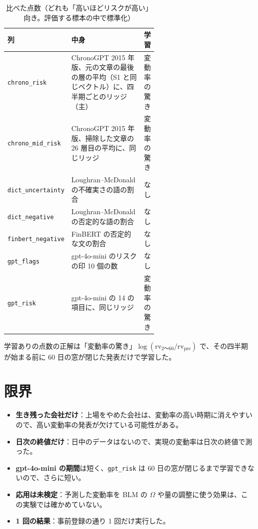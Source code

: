 \documentclass[xelatex,ja=standard,jafont=haranoaji,a4paper,10pt,openany]{bxjsreport}
\newcommand{\code}[1]{\texttt{#1}}
\begin{document}
\begin{table}[H]
\centering\small
\caption{比べた点数（どれも「高いほどリスクが高い」向き。評価する標本の中で標準化）}
\label{tab:scores}
\begin{tabular}{@{}lp{0.6\linewidth}l@{}}
\toprule
列 & 中身 & 学習 \\
\midrule
\code{chrono\_risk} & ChronoGPT 2015 年版、元の文章の最後の層の平均（S1 と同じベクトル）に、四半期ごとのリッジ（主） & 変動率の驚き \\
\code{chrono\_mid\_risk} & ChronoGPT 2015 年版、掃除した文章の 26 層目の平均に、同じリッジ & 変動率の驚き \\
\code{dict\_uncertainty} & Loughran--McDonald の不確実さの語の割合 & なし \\
\code{dict\_negative} & Loughran--McDonald の否定的な語の割合 & なし \\
\code{finbert\_negative} & FinBERT の否定的な文の割合 & なし \\
\code{gpt\_flags} & gpt-4o-mini のリスクの印 10 個の数 & なし \\
\code{gpt\_risk} & gpt-4o-mini の 14 の項目に、同じリッジ & 変動率の驚き \\
\bottomrule
\end{tabular}
\end{table}

学習ありの点数の正解は「変動率の驚き」$\log(\mathrm{rv}_{2\text{〜}60} / \mathrm{rv}_{\text{pre}})$ で、その四半期が始まる前に 60 日の窓が閉じた発表だけで学習した。



\chapter{限界}\label{ch:limits}

\begin{itemize}
\item \textbf{生き残った会社だけ}：上場をやめた会社は、変動率の高い時期に消えやすいので、高い変動率の発表が欠けている可能性がある。
\item \textbf{日次の終値だけ}：日中のデータはないので、実現の変動率は日次の終値で測った。
\item \textbf{gpt-4o-mini の期間}は短く、\code{gpt\_risk} は 60 日の窓が閉じるまで学習できないので、さらに短い。
\item \textbf{応用は未検定}：予測した変動率を BLM の $\Omega$ や量の調整に使う効果は、この実験では確かめていない。
\item \textbf{1 回の結果}：事前登録の通り 1 回だけ実行した。
\end{itemize}
\end{document}
